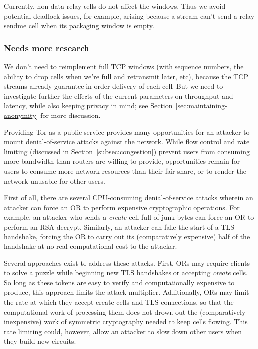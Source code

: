 \documentclass[times,10pt,twocolumn]{article}
\begin{document}
Currently, non-data relay cells do not affect the windows. Thus we
avoid potential deadlock issues, for example, arising because a stream
can't send a relay sendme cell when its packaging window is empty.

\subsubsection{Needs more research}

We don't need to reimplement full TCP windows (with sequence numbers,
the ability to drop cells when we're full and retransmit later, etc),
because the TCP streams already guarantee in-order delivery of each
cell. But we need to investigate further the effects of the current
parameters on throughput and latency, while also keeping privacy in mind;
see Section~\ref{sec:maintaining-anonymity} for more discussion.


\label{subsec:dos}

Providing Tor as a public service provides many opportunities for an
attacker to mount denial-of-service attacks against the network.  While
flow control and rate limiting (discussed in
Section~\ref{subsec:congestion}) prevent users from consuming more
bandwidth than routers are willing to provide, opportunities remain for
users to
consume more network resources than their fair share, or to render the
network unusable for other users.

First of all, there are several CPU-consuming denial-of-service
attacks wherein an attacker can force an OR to perform expensive
cryptographic operations.  For example, an attacker who sends a
\emph{create} cell full of junk bytes can force an OR to perform an RSA
decrypt.  Similarly, an attacker can
fake the start of a TLS handshake, forcing the OR to carry out its
(comparatively expensive) half of the handshake at no real computational
cost to the attacker.

Several approaches exist to address these attacks. First, ORs may
require clients to solve a puzzle \cite{puzzles-tls} while beginning new
TLS handshakes or accepting \emph{create} cells.  So long as these
tokens are easy to verify and computationally expensive to produce, this
approach limits the attack multiplier.  Additionally, ORs may limit
the rate at which they accept create cells and TLS connections, so that
the computational work of processing them does not drown out the (comparatively
inexpensive) work of symmetric cryptography needed to keep cells
flowing.  This rate limiting could, however, allow an attacker
to slow down other users when they build new circuits.
\end{document}
